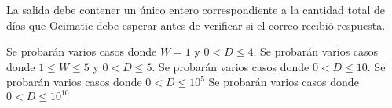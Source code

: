 \documentclass{oci}
\begin{document}
\begin{outputDescription}
  La salida debe contener un único entero correspondiente a la cantidad total de
  días que Ocimatic debe esperar antes de verificar si el correo recibió
  respuesta.
\end{outputDescription}

\newpage
\begin{scoreDescription}
   Se probarán varios casos donde $W=1$ y $0 < D \leq 4$.
   Se probarán varios casos donde $1 \leq W \leq 5$ y $0 < D \leq 5$.
   Se probarán varios casos donde $0 < D \leq 10$.
   Se probarán varios casos donde $0 < D \leq 10^5$
   Se probarán varios casos donde $0 < D \leq 10^{10}$
\end{scoreDescription}

\begin{sampleDescription}
\end{sampleDescription}
\end{document}
